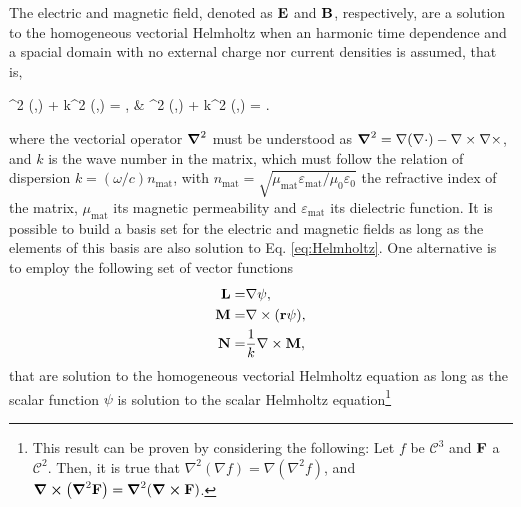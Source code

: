 
The electric and magnetic field, denoted as $\vb{E}$ and $\vb{B}$, respectively, are a solution to the homogeneous vectorial Helmholtz when an harmonic time dependence and a spacial domain with no external charge nor current densities is assumed, that is,
%
\begin{tcolorbox}[title = Vectorial Helmholtz Equation,	ams align, breakable]
	\grad^2 (,\omega) + k^2 (,\omega) = ,
		\qquad&\qquad
  	\grad^2 (,\omega) + k^2 (,\omega) = .
  	\label{eq:Helmholtz}
\end{tcolorbox}
%
\noindent where the vectorial operator $\grad^2$ must be understood as $\grad^2 = \nabla(\nabla\cdot) - \nabla\times\nabla\times $, and $k$ is the wave number in the matrix, which must follow the relation of dispersion $k = (\omega/c) n_\text{mat}$, with $n_\text{mat}=\sqrt{\mu_\text{mat}\varepsilon_\text{mat} /\mu_0\varepsilon_0}$ the refractive index of the matrix, $\mu_\text{mat}$ its magnetic permeability and $\varepsilon_\text{mat}$ its dielectric function. It is possible to build a basis set for the electric and magnetic fields as long as the elements of this basis are also solution to Eq. \eqref{eq:Helmholtz}. One alternative is to employ the following set of vector functions
%
\begin{subequations}
\begin{align}
	\vb{L} =& \nabla \psi,
	\label{eq:L}\\
	\vb{M} =& \nabla\times(\vb{r}\psi),
	\label{eq:M}\\
	\vb{N} =&  \frac{1}{k}\nabla\times\vb{M},
	\label{eq:N}
\end{align}%
\label{eq:VSH}%
\end{subequations}
%
that are solution to the homogeneous vectorial Helmholtz equation as long as the scalar function $\psi$ is solution to the scalar Helmholtz equation\footnote{%
	This result can be proven by considering the following: Let $f$ be $\mathcal{C}^3$ and $\vb{F}$ a $\mathcal{C}^2$. Then, it is true that $\nabla^2(\nabla f) = \nabla(\nabla^2 f)$, and $\curl(\grad^2\vb{F}) = \grad^2(\curl\vb{F})$. }%
%
